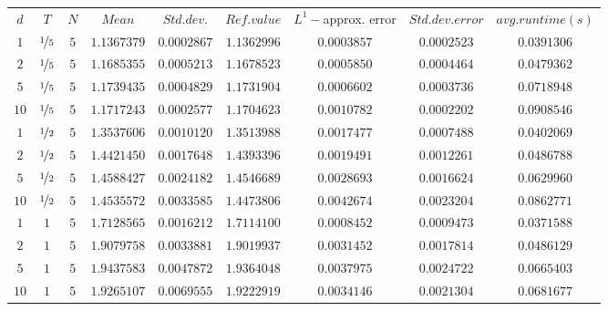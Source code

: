 \begin{tabular}{ccccccccc}
$d$ & $T$ & $N$ & $Mean$ & $Std. dev.$ & $Ref. value$ & $L^1-$approx. error & $Std. dev. error$ & $avg. runtime (s)$\\
$1$ & $\nicefrac{1}{5}$ & $5$ & $1.1367379$ & $0.0002867$ & $1.1362996$ & $0.0003857$ & $0.0002523$ & $0.0391306$\\
$2$ & $\nicefrac{1}{5}$ & $5$ & $1.1685355$ & $0.0005213$ & $1.1678523$ & $0.0005850$ & $0.0004464$ & $0.0479362$\\
$5$ & $\nicefrac{1}{5}$ & $5$ & $1.1739435$ & $0.0004829$ & $1.1731904$ & $0.0006602$ & $0.0003736$ & $0.0718948$\\
$10$ & $\nicefrac{1}{5}$ & $5$ & $1.1717243$ & $0.0002577$ & $1.1704623$ & $0.0010782$ & $0.0002202$ & $0.0908546$\\
$1$ & $\nicefrac{1}{2}$ & $5$ & $1.3537606$ & $0.0010120$ & $1.3513988$ & $0.0017477$ & $0.0007488$ & $0.0402069$\\
$2$ & $\nicefrac{1}{2}$ & $5$ & $1.4421450$ & $0.0017648$ & $1.4393396$ & $0.0019491$ & $0.0012261$ & $0.0486788$\\
$5$ & $\nicefrac{1}{2}$ & $5$ & $1.4588427$ & $0.0024182$ & $1.4546689$ & $0.0028693$ & $0.0016624$ & $0.0629960$\\
$10$ & $\nicefrac{1}{2}$ & $5$ & $1.4535572$ & $0.0033585$ & $1.4473806$ & $0.0042674$ & $0.0023204$ & $0.0862771$\\
$1$ & $1$ & $5$ & $1.7128565$ & $0.0016212$ & $1.7114100$ & $0.0008452$ & $0.0009473$ & $0.0371588$\\
$2$ & $1$ & $5$ & $1.9079758$ & $0.0033881$ & $1.9019937$ & $0.0031452$ & $0.0017814$ & $0.0486129$\\
$5$ & $1$ & $5$ & $1.9437583$ & $0.0047872$ & $1.9364048$ & $0.0037975$ & $0.0024722$ & $0.0665403$\\
$10$ & $1$ & $5$ & $1.9265107$ & $0.0069555$ & $1.9222919$ & $0.0034146$ & $0.0021304$ & $0.0681677$\\
\end{tabular}
